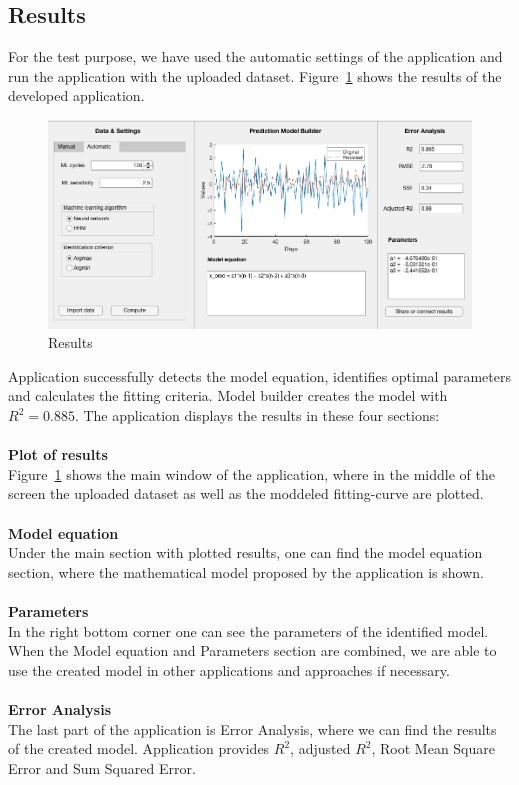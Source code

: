         \subsection{Results}\label{subsec:result}
        For the test purpose, we have used the automatic settings of the application and run the application with the uploaded
       dataset. Figure~\ref{fig:results} shows the results of the developed application.
               \begin{figure}[h!]
        \centering
            \includegraphics[width=\textwidth]{figures/result.png}
            \caption{Results}
            \label{fig:results}
    \end{figure}
        Application successfully detects the model equation, identifies optimal parameters and 
        calculates the fitting criteria. Model builder creates the model with $R^2 = 0.885$.
        The application displays the results in these four sections:\\
\\
        \textbf{Plot of results}\\
       Figure~\ref{fig:results} shows the main window of the application, where in the middle of the screen
       the uploaded dataset as well as the moddeled fitting-curve are plotted.\\
        \\
        \textbf{Model equation}\\
        Under the main section with plotted results, one can find the model equation section, where
       the mathematical model proposed by the application is shown.\\
        \\
        \textbf{Parameters}\\
        In the right bottom corner one can see the parameters of the identified model. When the
        Model equation and Parameters section are combined, we are able to use the created model in other
        applications and approaches if necessary.\\
        \\
        \textbf{Error Analysis}\\
        The last part of the application is Error Analysis, where we can find the 
        results of the created model. Application provides $R^2$, adjusted $R^2$,
        Root Mean Square Error and Sum Squared Error.
        
        